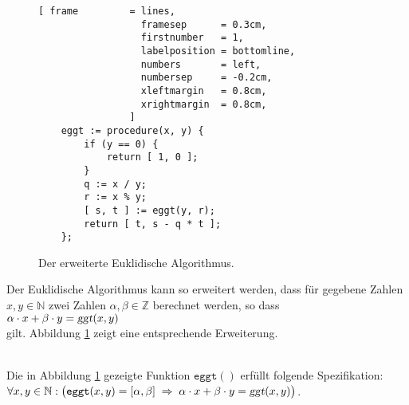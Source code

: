 \begin{figure}[!ht]
\centering
\begin{Verbatim}[ frame         = lines, 
                  framesep      = 0.3cm, 
                  firstnumber   = 1,
                  labelposition = bottomline,
                  numbers       = left,
                  numbersep     = -0.2cm,
                  xleftmargin   = 0.8cm,
                  xrightmargin  = 0.8cm,
                ]
    eggt := procedure(x, y) {
        if (y == 0) {
            return [ 1, 0 ];
        }
        q := x / y;
        r := x % y;
        [ s, t ] := eggt(y, r);
        return [ t, s - q * t ]; 
    };
\end{Verbatim}
\vspace*{-0.3cm}
\caption{Der erweiterte Euklidische Algorithmus.}
\label{fig:eggt.stlx}
\end{figure}

Der Euklidische Algorithmus kann so erweitert werden, dass für gegebene Zahlen $x,y \in \mathbb{N}$
zwei Zahlen $\alpha,\beta \in \mathbb{Z}$ berechnet werden, so dass 
\\[0.2cm]
\hspace*{1.3cm}
$\alpha \cdot x + \beta \cdot y = \textsl{ggt}(x, y)$
\\[0.2cm]
gilt.  Abbildung \ref{fig:eggt.stlx} zeigt eine entsprechende Erweiterung.

\begin{Satz} \hspace*{\fill} \\ 
  Die in Abbildung \ref{fig:eggt.stlx} gezeigte Funktion $\texttt{eggt}()$ erfüllt
  folgende Spezifikation:
  \\[0.2cm]
  \hspace*{1.3cm}
  $\forall x, y \in \mathbb{N}: \bigl(
   \mathtt{eggt}(x, y) = [ \alpha, \beta ] \;\Rightarrow\; 
   \alpha \cdot x + \beta \cdot y = \textsl{ggt}(x,y)\bigr)
  $.
\end{Satz}


